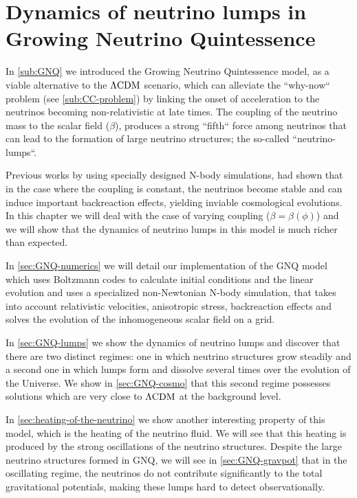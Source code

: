 \chapter{Dynamics of neutrino lumps in Growing Neutrino Quintessence \label{chap:GNQ}}


%


In \cref{sub:GNQ} we introduced the Growing Neutrino Quintessence model,
as a viable alternative to the $\Lambda\mathrm{CDM}$ scenario, which can alleviate the
``why-now`` problem (see \cref{sub:CC-problem}) by linking the 
onset of acceleration to the neutrinos becoming non-relativistic at
late times.
The coupling of the neutrino mass to the scalar field ($\beta$), produces
a strong ``fifth`` force among neutrinos that can lead to the formation 
of large neutrino structures; the so-called ``neutrino-lumps``. 

Previous works by \cite{ayaita_structure_2012, 
fuhrer_backreaction_2015} using specially designed N-body simulations, had shown that in the case where the coupling
is constant, the neutrinos become stable and can induce important backreaction
effects, yielding inviable cosmological evolutions.
In this chapter we will deal with the case of varying coupling ($\beta=\beta(\phi)$) and we will show that the dynamics of neutrino lumps in
this model is much richer than expected.

In \cref{sec:GNQ-numerics} we will detail our implementation of the GNQ
model which uses Boltzmann codes to calculate initial conditions and 
the linear evolution and uses a specialized non-Newtonian N-body simulation,
that takes into account relativistic velocities, anisotropic stress, backreaction
effects and solves the evolution of the inhomogeneous scalar field on a grid.

In \cref{sec:GNQ-lumps} we show the dynamics of neutrino lumps and discover
that there are two distinct regimes: one in which neutrino structures grow steadily
and a second one in which lumps form and dissolve several times over the evolution
of the Universe.
We show in \cref{sec:GNQ-cosmo} that this second regime possesses solutions
which are very close to $\Lambda\mathrm{CDM}$ at the background level.

In \cref{sec:heating-of-the-neutrino} we show another interesting property of
this model, which is the heating of the neutrino fluid. We will see that this heating is produced by the strong oscillations of the neutrino structures.
Despite the large neutrino structures formed in GNQ, we will see in \cref{sec:GNQ-gravpot} that in the oscillating regime, the neutrinos do not contribute significantly to the total gravitational potentials, making these lumps 
hard to detect observationally.


